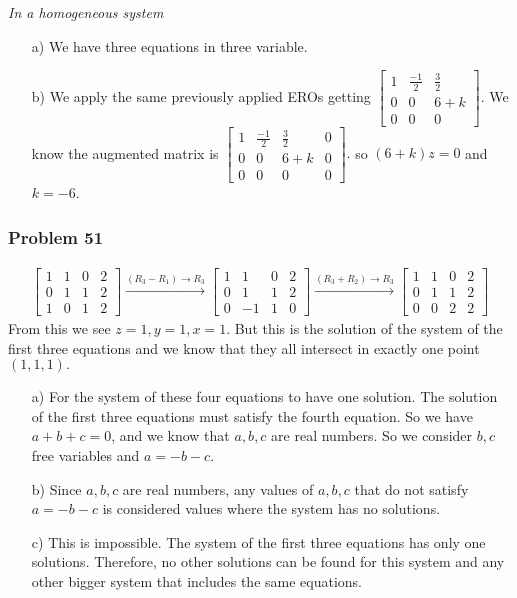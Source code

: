 \documentclass[a4paper,12pt]{article}
\begin{document}
\textit{In a homogeneous system}
\begin{itemize}
  \item [a)] We have three equations in three variable.
  \item [b)] We apply the same previously applied EROs getting $\begin{bmatrix}
      1 & \frac{-1}{2} & \frac{3}{2}\\
      0 & 0 & 6+k \\
      0 & 0 & 0
    \end{bmatrix}.$ We know the augmented matrix is $\begin{bmatrix}
      1 & \frac{-1}{2} & \frac{3}{2}&0\\
      0 & 0 & 6+k &0\\
      0 & 0 & 0 &0
    \end{bmatrix}.$ so $(6+k)z=0$ and $k=-6$.
\end{itemize}
\subsubsection*{Problem 51}
\begin{align*}\begin{bmatrix}
    1 & 1 & 0 & 2 \\
    0 & 1 & 1 & 2\\
    1 & 0 & 1 & 2
  \end{bmatrix} \xrightarrow{(R_3-R_1)\to R_3} \begin{bmatrix}
    1 & 1 & 0 & 2 \\
    0 & 1 & 1 & 2\\
    0 & -1 & 1 & 0
  \end{bmatrix} \xrightarrow{(R_3+R_2)\to R_3} \begin{bmatrix}
    1 & 1 & 0 & 2 \\
    0 & 1 & 1 & 2\\
    0 & 0 & 2 & 2
  \end{bmatrix}
\end{align*}
From this we see $z=1, y=1, x=1$. But this is the solution of the system of the first three equations and we know that they all intersect in exactly one point $(1,1,1).$
\begin{itemize}
    \item [a)] For the system of these four equations to have one solution. The solution of the first three equations must satisfy the fourth equation. So we have $a+b+c=0$, and we know that $a,b,c$ are real numbers. So we consider $b,c$ free variables and $a=-b-c$.
  \item [b)] Since $a,b,c$ are real numbers, any values of $a,b,c$ that do not satisfy $a=-b-c$ is considered values where the system has no solutions.
  \item [c)] This is impossible. The system of the first three equations has only one solutions. Therefore, no other solutions can be found for this system and any other bigger system that includes the same equations. 
\end{itemize}
\end{document}
